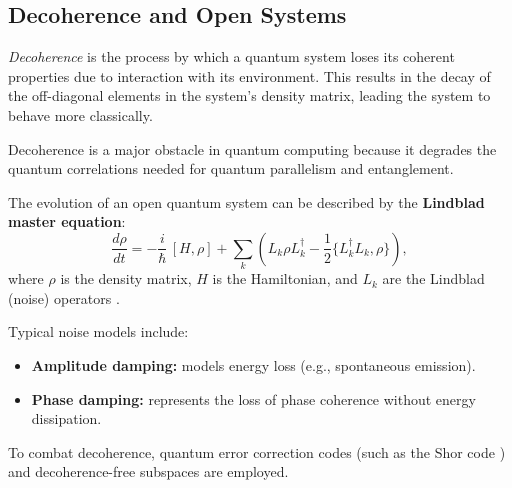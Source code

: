 
\subsection{Decoherence and Open Systems}
\label{subsec:decoherence}

\begin{definition}[Decoherence]
\emph{Decoherence} is the process by which a quantum system loses its coherent properties due to interaction with its environment. This results in the decay of the off-diagonal elements in the system's density matrix, leading the system to behave more classically.
\end{definition}

\begin{remark}
Decoherence is a major obstacle in quantum computing because it degrades the quantum correlations needed for quantum parallelism and entanglement.
\end{remark}

\begin{definition}
The evolution of an open quantum system can be described by the \textbf{Lindblad master equation}:
\[
\frac{d\rho}{dt} = -\frac{i}{\hbar}\,[H, \rho] + \sum_k \left( L_k \rho L_k^\dagger - \frac{1}{2}\{L_k^\dagger L_k, \rho\} \right),
\]
where \(\rho\) is the density matrix, \(H\) is the Hamiltonian, and \(L_k\) are the Lindblad (noise) operators \cite{breuer2002theory}.
\end{definition}

\begin{example}
Typical noise models include:
\begin{itemize}
    \item \textbf{Amplitude damping:} models energy loss (e.g., spontaneous emission).
    \item \textbf{Phase damping:} represents the loss of phase coherence without energy dissipation.
\end{itemize}
\end{example}

\begin{observation}
To combat decoherence, quantum error correction codes (such as the Shor code \cite{shor1995scheme}) and decoherence-free subspaces are employed.
\end{observation}
